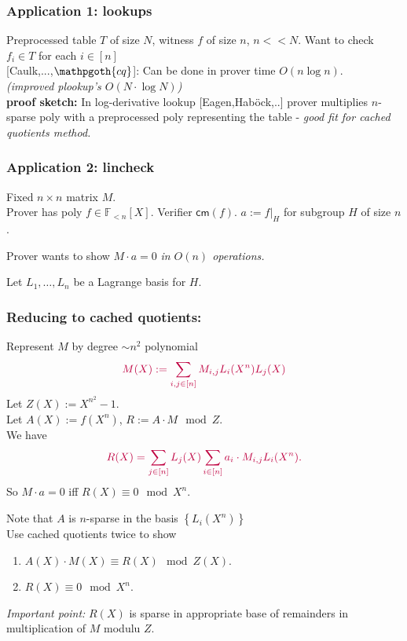 \documentclass[shadesubsections,compress,14pt,mathserif]{beamer}
\newcommand{\F}{\ensuremath{{\mathbb F}}}
\newcommand{\set}[1]{\ensuremath{\left\{#1\right\}}}
\newcommand{\cm}{\ensuremath{\mathsf{cm}}}
\newcommand{\defeq}{\ensuremath{:=}}
\newcommand{\polysofdeg}[1]{\F_{< #1}[X]}
\newcommand{\nl}{\\ \pause \vspace{0.2in}}
\newcommand{\cq}{\mathpgoth{cq} }
\begin{document}
    

\begin{frame}
\frametitle{Application  1: lookups }
Preprocessed table $T$ of size $N$, witness $f$ of size $n$, $n<<N$. Want to check $f_i\in T$ for each $i\in [n]$\nl 
{\color{blue} \small{[Caulk,...,$\cq$]}}: Can be done in  prover time $O(n\log n)$. \\
\emph{\small (improved plookup's $O(N\cdot \log N)$)}\nl
\textbf{proof sketch:} In log-derivative lookup {\color{blue} \small [Eagen,Hab{\"{o}}ck,..]} prover multiplies $n$-sparse poly with 
a preprocessed poly representing the table - \emph{good fit for cached quotients method.}
 
\end{frame}
\begin{frame}
\frametitle{Application 2: lincheck}
Fixed $n\times n$ matrix $M$.\nl
Prover has poly $f\in \polysofdeg{n}$.
Verifier $\cm(f)$.
$a\defeq f|_H$ for subgroup $H$ of size $n$.\nl

Prover wants to show $M\cdot a =0$
\emph{in $O(n)$ operations.}\nl

Let $L_1,\ldots,L_n$ be a Lagrange basis for $H$.


\end{frame}
\begin{frame}
 \frametitle{Reducing to cached quotients:}
 Represent $M$ by degree $\sim n^2$ polynomial
 \[\color{purple} M(X)\defeq \sum_{i,j \in [n]} M_{i,j} L_i(X^n)L_j(X)\]
Let $Z(X)\defeq X^{n^2}-1$.\nl
Let $A(X)\defeq f(X^n)$, $R\defeq A\cdot M \mod Z$.\nl
We have
\[\color{purple} R(X)=\sum_{j\in [n]}L_j(X) \sum_{i\in [n]} a_i\cdot M_{i,j}L_i(X^n).\]\pause
So $M\cdot a =0$ iff $R(X)\equiv 0 \mod X^n$.
% 
\end{frame}
\begin{frame}
Note that $A$ is $n$-sparse in the basis $\set{L_i(X^n)}$\nl
Use cached quotients twice to show
\begin{enumerate}
 \item 
 $A(X)\cdot M(X) \equiv R(X) \mod Z(X).$
 \item $R(X)\equiv 0 \mod X^n$.\nl
\end{enumerate}
\textit{Important point:} $R(X)$ is sparse in appropriate base of remainders in multiplication of $M$ modulu $Z$.
  
\end{frame}
\end{document}
